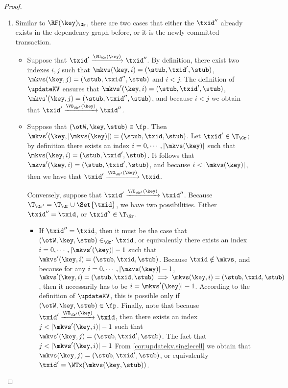 \begin{proof}
\begin{enumerate}
\item 
Similar to \( \RF(\key)_{\Gr} \), there are two cases that either the \( \txid'' \) already exists in the dependency graph before,
or it is the newly committed transaction.
\begin{itemize}
\item Suppose that $\txid' \xrightarrow{\VO_{\Gr}(\key)} \txid''$. 
By definition, there exist two indexes $i, j$ such that 
$\mkvs(\key, i) = (\stub, \txid', \stub)$, $\mkvs(\key, j) = (\stub, \txid'', \stub)$ 
and $i < j$. The definition of $\updateKV$ ensures that 
$\mkvs'(\key, i) = (\stub, \txid', \stub)$, $\mkvs'(\key, j) = (\stub, \txid'', \stub)$, 
and because $i < j$ we obtain that $\txid' \xrightarrow{\VO_{\Gr'}(\key)} \txid''$. 

\item Suppose that $(\otW, \key, \stub) \in \fp$. Then $\mkvs'(\key, \lvert \mkvs(\key) \rvert) = (\stub, \txid, \stub)$.
Let $\txid' \in \T_{\Gr}$; by definition there exists an index $i = 0,\cdots, \lvert \mkvs(\key) \rvert$ 
such that $\mkvs(\key, i) = (\stub, \txid', \stub)$. It follows that $\mkvs'(\key, i) = (\stub, \txid', \stub)$, and 
because $i < \lvert \mkvs(\key) \rvert$, then we have that $\txid' \xrightarrow{\VO_{\Gr'}(\key)} \txid$. 

Conversely, suppose that $\txid' \xrightarrow{\VO_{\Gr'}(\key)} \txid''$. Because 
$\T_{\Gr'} = \T_{\Gr} \cup \Set{ \txid }$, we have two possibilities. Either $\txid'' = \txid$, 
or $\txid'' \in \T_{\Gr}$. 

\begin{itemize}
\item If $\txid'' = \txid$, then it must be the case that $(\otW, \key, \stub) \in_{\Gr'} \txid$, 
or equivalently there exists an index $i=0,\cdots, \lvert \mkvs'(\key) \rvert -1 $ such that 
$\mkvs'(\key, i) = (\stub, \txid, \stub)$. Because $\txid \notin \mkvs$, and because for any 
$i = 0, \cdots, \lvert \mkvs(\key) \rvert - 1$, $\mkvs'(\key, i) = (\stub, \txid, \stub) \implies 
\mkvs(\key, i) = (\stub, \txid, \stub)$, then it necessarily has to be $i = \mkvs'(\key) \rvert - 1$. 
According to the definition of $\updateKV$, this is possible only if $(\otW,\key, \stub) \in \fp$. 
Finally, note that because $\txid' \xrightarrow{\VO_{\Gr'}(\key)} \txid$, then 
there exists an index $j < \lvert \mkvs'(\key, i) \rvert - 1$ such that 
$\mkvs'(\key, j) = (\stub, \txid' ,\stub)$. The fact that $j < \lvert \mkvs'(\key, i) \rvert - 1$ 
From \cref{cor:updatekv.singlecell} we obtain that $\mkvs(\key, j) = (\stub, \txid', \stub)$, 
or equivalently $\txid' = \WTx(\mkvs(\key, \stub))$. 


\end{itemize}
\end{itemize}
\end{enumerate}
\end{proof}
